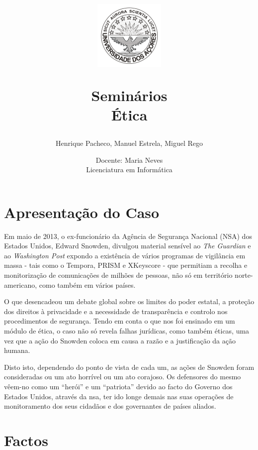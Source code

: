 \documentclass[a4paper,12pt]{article}
\title{
    \vspace{-1cm} 
    \begin{figure}[H]
        \centering
        \includegraphics[width=0.3\textwidth]{./images/uac_logo.png}
    \end{figure}
    \vspace{0.5cm} 
    \textbf{Seminários}
    \\
    Ética
}
\author{Henrique Pacheco, Manuel Estrela, Miguel Rego}
\date{Docente: Maria Neves \\ \vspace{0.5cm}Licenciatura em Informática }
\begin{document}
\maketitle

\begin{abstract}
\end{abstract}

\newpage
\tableofcontents

\newpage

\section{Apresentação do Caso}

Em maio de 2013, o ex-funcionário da Agência de Segurança Nacional (NSA) dos Estados Unidos, Edward Snowden, divulgou material sensível ao \textit{The Guardian} e ao \textit{Washington Post} expondo a existência de vários programas de vigilância em massa - tais como o \gls{Tempora}, \gls{PRISM} e \gls{XKeyscore} - que permitiam a recolha e monitorização de comunicações de milhões de pessoas, não só em território norte-americano, como também em vários países.

O que desencadeou um debate global sobre os limites do poder estatal, a proteção dos direitos à privacidade e a necessidade de transparência e controlo nos procedimentos de segurança.
Tendo em conta o que nos foi ensinado em um módulo de ética, o caso não só revela falhas jurídicas, como também éticas, uma vez que a ação do Snowden coloca em causa a razão e a justificação da ação humana.

Disto isto, dependendo do ponto de vista de cada um, as ações de Snowden foram consideradas ou um ato horrível ou um ato corajoso. Os defensores do mesmo vêem-no como um “herói” e um “patriota” devido ao facto do Governo dos Estados Unidos, através da \acrshort{nsa}, ter ido longe demais nas suas operações de monitoramento dos seus cidadãos e dos governantes de países aliados.
\cite{tavani} 

\section{Factos}
\end{document}
